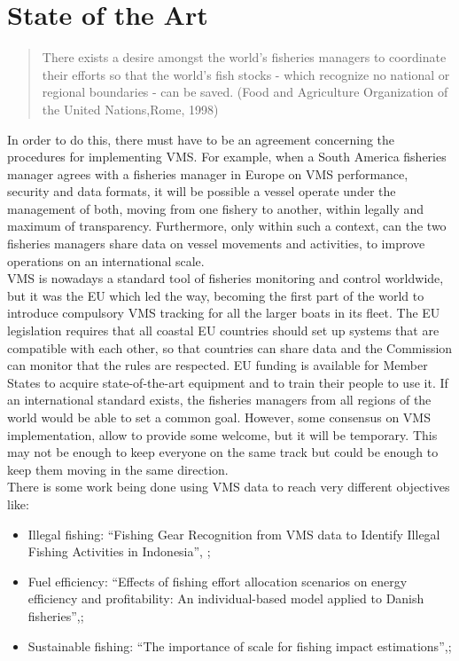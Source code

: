 % 
%  
%
\chapter{State of the Art}
\label{cha:state_of_the_art}

\begin{quotation}
There exists a desire amongst the world’s fisheries managers to coordinate their efforts so that the world’s fish stocks - which recognize no national or regional boundaries - can be saved. \hfill (Food and Agriculture Organization of the United Nations,Rome, 1998)
\end{quotation}


In order to do this, there must have to be an agreement concerning the procedures for implementing VMS. For example, when a South America fisheries manager agrees with a fisheries manager in Europe on VMS performance, security and data formats, it will be possible a vessel operate under the management of both, moving from one fishery to another, within legally and maximum of transparency. Furthermore, only within such a context, can the two fisheries managers share data on vessel movements and activities, to improve operations on an international scale.\\
VMS is nowadays a standard tool of fisheries monitoring and control worldwide, but it was the EU which led the way, becoming the first part of the world to introduce compulsory VMS tracking for all the larger boats in its fleet. The EU legislation requires that all coastal EU countries should set up systems that are compatible with each other, so that countries can share data and the Commission can monitor that the rules are respected. EU funding is available for Member States to acquire state-of-the-art equipment and to train their people to use it. \cite{WEBSITE:EuropeanCommissionVMS}
If an international standard exists, the fisheries managers from all regions of the world would be able to set a common goal. However, some consensus on VMS implementation, allow to provide some welcome, but it will be temporary. This may not be enough to keep everyone on the same track but could be enough to keep them moving in the same direction.\\

There is some work being done using VMS data to reach very different objectives like:
\begin{itemize}
\item	Illegal fishing: “Fishing Gear Recognition from VMS data to Identify Illegal Fishing Activities in Indonesia”, \cite{MarzukiIllegalFishing};
\item	Fuel efficiency: “Effects of fishing effort allocation scenarios on energy efficiency and profitability: An individual-based model applied to Danish fisheries”,\cite{BastardieFishingEfficiency};
\item	Sustainable fishing: “The importance of scale for fishing impact estimations”,\cite{QuirijnsImportanceImpact};
\end{itemize}

